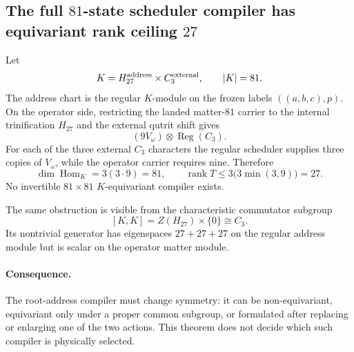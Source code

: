 \subsection*{The full $81$-state scheduler compiler has equivariant rank ceiling $27$}

Let
\[
K=H_{27}^{\rm address}\times C_3^{\rm external},
\qquad |K|=81.
\]
The address chart is the regular $K$-module on the frozen labels
$((a,b,c),p)$.  On the operator side, restricting the landed matter-$81$
carrier to the internal trinification $H_{27}$ and the external qutrit shift
gives
\[
(9V_\omega)\otimes\operatorname{Reg}(C_3).
\]
For each of the three external $C_3$ characters the regular scheduler supplies
three copies of $V_\omega$, while the operator carrier requires nine.
Therefore
\[
\dim\operatorname{Hom}_{K}=3(3\cdot9)=81,
\qquad
\boxed{\operatorname{rank}T\le
3\bigl(3\min(3,9)\bigr)=27.}
\]
No invertible $81\times81$ $K$-equivariant compiler exists.

The same obstruction is visible from the characteristic commutator subgroup
\[
[K,K]=Z(H_{27})\times\{0\}\cong C_3.
\]
Its nontrivial generator has eigenspaces $27+27+27$ on the regular address
module but is scalar on the operator matter module.

\paragraph{Consequence.}
The root-address compiler must change symmetry: it can be non-equivariant,
equivariant only under a proper common subgroup, or formulated after replacing
or enlarging one of the two actions.  This theorem does not decide which such
compiler is physically selected.
